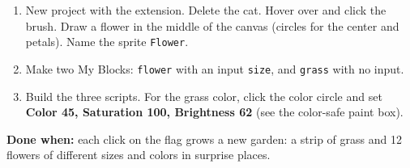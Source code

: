 \begin{exercise}
\begin{enumerate}[leftmargin=1.4em,itemsep=1pt]
  \item New project with the  extension. Delete the cat. Hover over  and click the  brush. Draw a flower in the middle of the canvas (circles for the center and petals). Name the sprite \texttt{Flower}.
  \item Make two My Blocks: \texttt{flower} with an input \texttt{size}, and \texttt{grass} with no input.
  \item Build the three scripts. For the grass color, click the color circle and set \textbf{Color 45, Saturation 100, Brightness 62} (see the color-safe paint box).
\end{enumerate}
\begin{center}
\begin{scratch}[scale=0.72]
\end{scratch}
\hspace{0.4cm}
\begin{scratch}[scale=0.72]
\end{scratch}

\medskip
\begin{scratch}[scale=0.72]
\end{scratch}
\end{center}
\textbf{Done when:} each click on the flag grows a new garden: a strip of grass and 12 flowers of different sizes and colors in surprise places.
\end{exercise}

